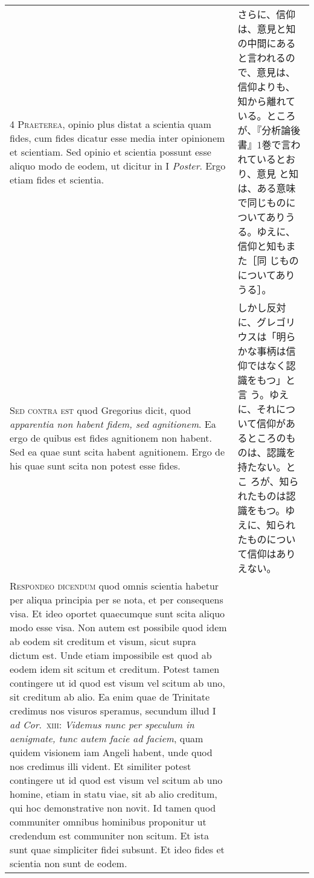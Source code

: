 \documentclass[10pt]{jsarticle} %
\begin{document}
\begin{longtable}{p{21em}p{21em}}
\\


{\scshape 4 Praeterea}, opinio plus distat a
scientia quam fides, cum fides dicatur esse media inter opinionem et
scientiam. Sed opinio et scientia possunt esse aliquo modo de eodem, ut
dicitur in I {\itshape Poster}. Ergo etiam fides et scientia.

&

さらに、信仰は、意見と知の中間にあると言われるので、意見は、信仰よりも、
 知から離れている。ところが、『分析論後書』1巻で言われているとおり、意見
 と知は、ある意味で同じものについてありうる。ゆえに、信仰と知もまた［同
 じものについてありうる］。

\\


{\scshape Sed contra est} quod Gregorius dicit, quod {\itshape
apparentia non habent fidem, sed agnitionem}. Ea ergo de quibus est
fides agnitionem non habent. Sed ea quae sunt scita habent
agnitionem. Ergo de his quae sunt scita non potest esse fides.

&

しかし反対に、グレゴリウスは「明らかな事柄は信仰ではなく認識をもつ」と言
 う。ゆえに、それについて信仰があるところのものは、認識を持たない。とこ
 ろが、知られたものは認識をもつ。ゆえに、知られたものについて信仰はあり
 えない。

\\


{\scshape Respondeo dicendum} quod omnis scientia habetur per aliqua
principia per se nota, et per consequens visa. Et ideo oportet
quaecumque sunt scita aliquo modo esse visa. Non autem est possibile
quod idem ab eodem sit creditum et visum, sicut supra dictum est. Unde
etiam impossibile est quod ab eodem idem sit scitum et creditum. Potest
tamen contingere ut id quod est visum vel scitum ab uno, sit creditum ab
alio. Ea enim quae de Trinitate credimus nos visuros speramus, secundum
illud I {\itshape ad Cor}.~{\scshape xiii}: {\itshape Videmus nunc per
speculum in aenigmate, tunc autem facie ad faciem}, quam quidem visionem
iam Angeli habent, unde quod nos credimus illi vident. Et similiter
potest contingere ut id quod est visum vel scitum ab uno homine, etiam
in statu viae, sit ab alio creditum, qui hoc demonstrative non novit. Id
tamen quod communiter omnibus hominibus proponitur ut credendum est
communiter non scitum. Et ista sunt quae simpliciter fidei subsunt. Et
ideo fides et scientia non sunt de eodem.

&


\end{longtable}
\end{document}

